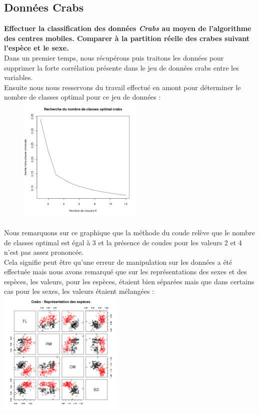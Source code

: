 \documentclass[a4paper, 10pt]{article}
\begin{document}
\newpage
\subsection{Donn\'ees Crabs}
\textbf{Effectuer la classification des donn\'ees \textit{Crabs} au moyen de l'algorithme des centres mobiles.
Comparer \`a la partition r\'eelle des crabes suivant l'esp\`ece et le sexe.}\\
Dans un premier temps, nous r\'ecup\'erons puis traitons les donn\'ees pour supprimer la forte corr\'elation pr\'esente dans le jeu de donn\'ees
crabs entre les variables.\\
Ensuite nous nous resservons du travail effectu\'e en amont pour d\'eterminer le nombre de classes optimal pour ce jeu de donn\'ees :\\
\includegraphics[height = 6cm, width = 8cm]{plots/plot_inertie_intra_2.png}\\ \\
Nous remarquons sur ce graphique que la m\'ethode du coude rel\`eve que le nombre de classes optimal est \'egal \`a 3 et
la pr\'esence de coudes pour les valeurs 2 et 4 n'est pas assez prononc\'ee.\\
Cela signifie peut \^etre qu'une erreur de manipulation sur les donn\'ees a \'et\'e effectu\'ee mais
nous avons remarqu\'e que sur les repr\'esentations des sexes et des esp\`eces, les valeurs, pour les esp\`eces, \'etaient bien s\'epar\'ees
mais que dans certains cas pour les sexes, les valeurs \'etaient m\'elang\'ees :\\
\includegraphics[height = 6cm, width = 6cm]{plots/plot_crabs_sp_2.png}
\end{document}

